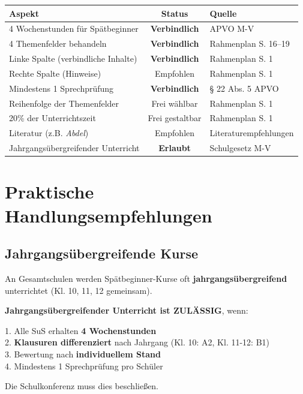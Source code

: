 \documentclass[10pt,a4paper]{article}
\begin{document}
\begin{center}
\begin{tabular}{|p{5.5cm}|c|p{5.5cm}|}
\hline
\rowcolor{spaet}\color{white}\textbf{Aspekt} & \color{white}\textbf{Status} & \color{white}\textbf{Quelle} \\
\hline
4 Wochenstunden für Spätbeginner & \textbf{Verbindlich} & APVO M-V \\
\hline
4 Themenfelder behandeln & \textbf{Verbindlich} & Rahmenplan S. 16--19 \\
\hline
Linke Spalte (verbindliche Inhalte) & \textbf{Verbindlich} & Rahmenplan S. 1 \\
\hline
Rechte Spalte (Hinweise) & Empfohlen & Rahmenplan S. 1 \\
\hline
Mindestens 1 Sprechprüfung & \textbf{Verbindlich} & § 22 Abs. 5 APVO \\
\hline
Reihenfolge der Themenfelder & Frei wählbar & Rahmenplan S. 1 \\
\hline
20\% der Unterrichtszeit & Frei gestaltbar & Rahmenplan S. 1 \\
\hline
Literatur (z.B. \textit{Abdel}) & Empfohlen & Literaturempfehlungen \\
\hline
Jahrgangsübergreifender Unterricht & \textbf{Erlaubt} & Schulgesetz M-V \\
\hline
\end{tabular}
\end{center}

\newpage


\section{Praktische Handlungsempfehlungen}

\subsection{Jahrgangsübergreifende Kurse}

An Gesamtschulen werden Spätbeginner-Kurse oft \textbf{jahrgangsübergreifend} unterrichtet (Kl. 10, 11, 12 gemeinsam).

\begin{tcolorbox}[colback=lightspaet, colframe=spaet, title=\textbf{HANDLUNGSEMPFEHLUNG}]
\textbf{Jahrgangsübergreifender Unterricht ist ZULÄSSIG}, wenn:

1. Alle SuS erhalten \textbf{4 Wochenstunden}\\
2. \textbf{Klausuren differenziert} nach Jahrgang (Kl. 10: A2, Kl. 11-12: B1)\\
3. Bewertung nach \textbf{individuellem Stand}\\
4. Mindestens 1 Sprechprüfung pro Schüler

Die Schulkonferenz muss dies beschließen.
\end{tcolorbox}
\end{document}
